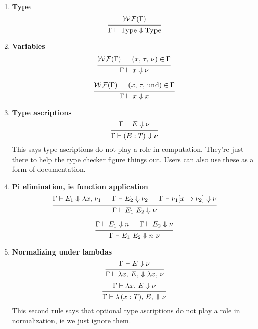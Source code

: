 \documentclass{article}
\begin{document}
\begin{enumerate}
\item \textbf{Type}
  \[
    \begin{prooftree}
      \hypo{\wf(\Gamma)}
      \infer1{\Gamma \vdash \Type \Downarrow \Type} 
    \end{prooftree}
  \]
\item \textbf{Variables} \\
  \[
    \begin{prooftree}
      \hypo{\wf(\Gamma)}
      \hypo{(x, \, \tau, \, \nu) \in \Gamma}
      \infer2{\Gamma \vdash x \Downarrow \nu}
    \end{prooftree} 
  \]

  \[
    \begin{prooftree}
      \hypo{\wf(\Gamma)}
      \hypo{(x, \, \tau, \, \text{und}) \in \Gamma}
      \infer2{\Gamma \vdash x \Downarrow x}
    \end{prooftree} 
  \]

\item \textbf{Type ascriptions} \\
  \[
    \begin{prooftree}
      \hypo{\Gamma \vdash E \Downarrow \nu}
      \infer1{\Gamma \vdash (E : T) \Downarrow \nu}
    \end{prooftree}
  \]
  This says type ascriptions do not play a role in computation. They're just
  there to help the type checker figure things out. Users can also use these as
  a form of documentation.
 
\item \textbf{Pi elimination, ie function application} \\
  \[
    \begin{prooftree}
      \hypo{\Gamma \vdash E_1 \Downarrow \lambda x, \, \nu_1}
      \hypo{\Gamma \vdash E_2 \Downarrow \nu_2}
      \hypo{\Gamma \vdash \nu_1[x \mapsto \nu_2] \Downarrow \nu}
      \infer3{\Gamma \vdash E_1 \,\, E_2 \Downarrow \nu}
    \end{prooftree}
  \]

  \[
    \begin{prooftree}
      \hypo{\Gamma \vdash E_1 \Downarrow n}
      \hypo{\Gamma \vdash E_2 \Downarrow \nu}
      \infer2{\Gamma \vdash E_1 \,\, E_2 \Downarrow n \,\, \nu}
    \end{prooftree}
  \]

\item \textbf{Normalizing under lambdas} \\
  \[
    \begin{prooftree}
      \hypo{\Gamma \vdash E \Downarrow \nu}
      \infer1{\Gamma \vdash \lambda x, \, E, \, \Downarrow \lambda x, \, \nu}
    \end{prooftree}
  \]
  \[
    \begin{prooftree}
      \hypo{\Gamma \vdash \lambda x, \, E \Downarrow \nu}
      \infer1{\Gamma \vdash \lambda \, (x : T), \, E, \, \Downarrow \nu}
    \end{prooftree}
  \]
  This second rule says that optional type ascriptions do not play a role in
  normalization, ie we just ignore them.


\end{enumerate}
\end{document}
